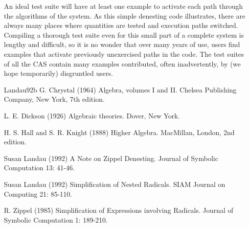 \documentclass[11pt,letterpaper]{article}
\begin{document}
An ideal test suite will have at least one example to activate each path through the algorithms of the system. As this simple denesting code illustrates, there are always many places where quantities are tested and execution paths switched. Compiling a thorough test suite even for this small part of a complete system is lengthy and difficult, so it is no wonder that over many years of use, users find examples that activate previously unexercised paths in the code. The test suites of all the CAS contain many examples contributed, often inadvertently, by (we hope temporarily) disgruntled users.

\begin{thebibliography}{Landau92b}
 G. Chrystal (1964) Algebra, volumes I and II. Chelsea Publishing Company, New York, 7th edition.

 L. E. Dickson (1926) Algebraic theories. Dover, New York.

 H. S. Hall and S. R. Knight (1888) Higher Algebra. MacMillan, London, 2nd edition.

 Susan Landau (1992) A Note on Zippel Denesting. Journal of Symbolic Computation 13: 41-46.

 Susan Landau (1992) Simplification of Nested Radicals. SIAM Journal on Computing 21: 85-110.

 R. Zippel (1985) Simplification of Expressions involving Radicals. Journal of Symbolic Computation 1: 189-210.
\end{thebibliography}
\end{document}
